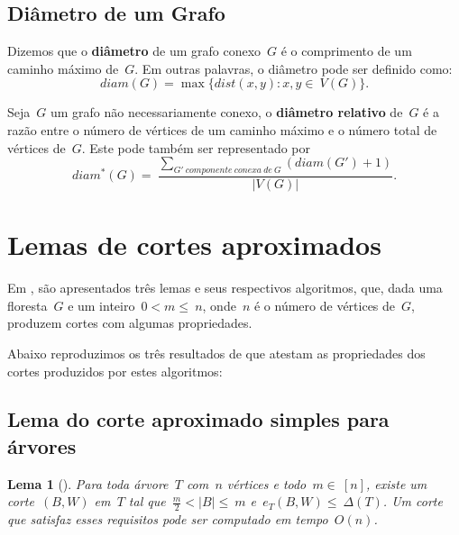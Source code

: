 \documentclass[a4paper,12pt]{article}
\newtheorem{lem}{Lema}
\begin{document}
	\bigskip
	\bigskip


	\subsection{Diâmetro de um Grafo}

	Dizemos que o \textbf{diâmetro} de um grafo conexo~$G$ é o
	comprimento de um caminho máximo de~$G$. 
	Em outras palavras, o diâmetro pode ser definido como:
	$$ diam(G)=\max\{dist(x,y):x,y\in~V(G)\}.$$

	\bigskip

	Seja~$G$ um grafo não necessariamente conexo,
	o \textbf{diâmetro relativo} de~$G$
	 é a razão entre o número
	de vértices de um caminho máximo e o número total de vértices
	de~$G$. Este pode também ser representado por
	$$ diam^*(G) =~\frac{\displaystyle\sum_{
	G'~componente~conexa~de~G}^{}(diam(G')+1)}{|V(G)|}.$$
    
\newpage
\section {Lemas de cortes aproximados}

Em \cite{Schmidt15}, são apresentados três lemas e seus
respectivos algoritmos, que, dada uma 
floresta~$G$ e um inteiro~$0<m\le~n$, onde~$n$ é o número de vértices 
de~$G$, produzem cortes com algumas propriedades.

Abaixo reproduzimos os três resultados de \cite{Schmidt15} que 
atestam as propriedades dos cortes produzidos por estes algoritmos:

\bigskip
\bigskip
\bigskip

\subsection{Lema do corte aproximado simples para árvores}
\begin{lem}[]
\label{lema:simpleApproxCutTree}
	Para toda árvore~$T$ com~$n$ vértices e todo~$m \in~[n]$,
	existe um corte~$(B,W)$ em~$T$ tal 
	que~$\frac{m}{2} <|B| \le~m$ e~$e_T(B,W) \le~\Delta(T)$.
	Um corte que satisfaz esses requisitos pode ser computado em
	tempo~$O(n)$.
\end{lem}
\end{document}
